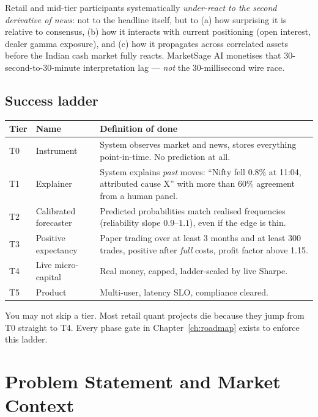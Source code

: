 \begin{keybox}[title={Core Alpha Hypothesis}]
Retail and mid-tier participants systematically \emph{under-react to the second
derivative of news}: not to the headline itself, but to (a) how surprising it is
relative to consensus, (b) how it interacts with current positioning (open
interest, dealer gamma exposure), and (c) how it propagates across correlated
assets before the Indian cash market fully reacts. MarketSage AI monetises that
30-second-to-30-minute interpretation lag --- \emph{not} the 30-millisecond wire
race.
\end{keybox}

\section{Success ladder}

\begin{longtable}{@{}llp{9.0cm}@{}}
\toprule
\textbf{Tier} & \textbf{Name} & \textbf{Definition of done}\\
\midrule
T0 & Instrument & System observes market and news, stores everything
point-in-time. No prediction at all.\\
T1 & Explainer & System explains \emph{past} moves: ``Nifty fell 0.8\% at 11:04,
attributed cause X'' with more than 60\% agreement from a human panel.\\
T2 & Calibrated forecaster & Predicted probabilities match realised frequencies
(reliability slope $0.9$--$1.1$), even if the edge is thin.\\
T3 & Positive expectancy & Paper trading over at least 3 months and at least 300
trades, positive after \emph{full} costs, profit factor above 1.15.\\
T4 & Live micro-capital & Real money, capped, ladder-scaled by live Sharpe.\\
T5 & Product & Multi-user, latency SLO, compliance cleared.\\
\bottomrule
\end{longtable}

\begin{warnbox}[title={Non-negotiable rule}]
You may not skip a tier. Most retail quant projects die because they jump from
T0 straight to T4. Every phase gate in Chapter~\ref{ch:roadmap} exists to
enforce this ladder.
\end{warnbox}

\chapter{Problem Statement and Market Context}

